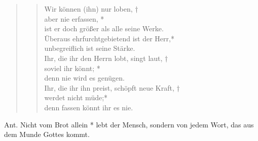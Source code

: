 \begin{quote}
\begin{verse}
 
\vin Wir können (ihn) nur loben, †\\
\vin aber nie erfassen, *\\
\vin ist er doch größer als alle seine Werke.\\
Überaus ehrfurchtgebietend ist der Herr,*\\
unbegreiflich ist seine Stärke.\\
\vin Ihr, die ihr den Herrn lobt, singt laut, †\\
\vin soviel ihr könnt; *\\
\vin denn nie wird es genügen.\\
Ihr, die ihr ihn preist, schöpft neue Kraft, †\\
werdet nicht müde;*\\
denn fassen könnt ihr es nie. \\

\end{verse}
\end{quote}

\begin{flushleft}


\end{flushleft}

\newpage


\vspace{0.2cm}


\def\greinitialformat#1{{\fontsize{40}{40}\selectfont #1}}
\gresetfirstlineaboveinitial{\small \textcolor{red}{Is 1}}{}
\setaboveinitialseparation{0.72mm}


\medskip

\begin{sloppypar}
{\noindent\rm{Ant. Nicht vom Brot allein * lebt der Mensch, sondern von jedem Wort, das aus dem Munde Gottes kommt.}}
\end{sloppypar}

\medskip


